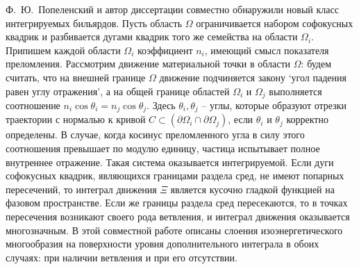 
Ф.~Ю.~Попеленский и автор диссертации совместно обнаружили новый класс интегрируемых бильярдов.
Пусть область $\Omega$ ограничивается набором софокусных квадрик и разбивается дугами квадрик того же семейства на области $\Omega_i$. Припишем каждой области $\Omega_i$ коэффициент $n_i$, имеющий смысл показателя преломления.
Рассмотрим движение материальной точки в области $\Omega$: будем считать, что на внешней границе $\Omega$ движение подчиняется закону `угол падения равен углу отражения', а на общей границе областей $\Omega_i$ и $\Omega_j$ выполняется соотношение $n_i \cos \theta_i = n_j \cos \theta_j$. Здесь $\theta_i, \theta_j$ -- углы, которые образуют отрезки траектории с нормалью к кривой $C \subset (\partial \Omega_i \cap \partial \Omega_j)$, если $\theta_i$ и $\theta_j$ корректно определены. 
В случае, когда косинус преломленного угла в силу этого соотношения превышает по модулю единицу, частица испытывает полное внутреннее отражение.
Такая система оказывается интегрируемой. Если дуги софокусных квадрик, являющихся границами раздела сред, не имеют попарных пересечений, то интеграл движения $\Xi$ является кусочно гладкой функцией на фазовом пространстве.
Если же границы раздела сред пересекаются, то в точках пересечения возникают своего рода ветвления, и интеграл движения оказывается многозначным.
В этой совместной работе описаны слоения изоэнергетического многообразия на поверхности уровня дополнительного интеграла в обоих случаях: при наличии ветвления и при его отсутствии.  
\bigskip


